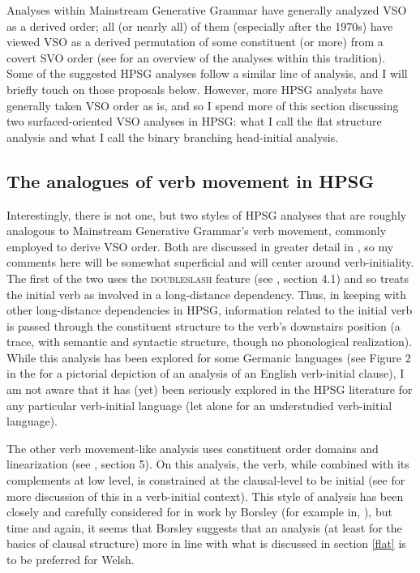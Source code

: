 \documentclass[output=paper]{langsci/langscibook}
\begin{document}
{Analyses within Mainstream Generative Grammar have generally analyzed VSO as a derived order; all (or nearly all) of them (especially after the 1970s) have viewed VSO as a derived permutation of some constituent (or more) from a covert SVO order (see \citealt{clemenspolinsky17} for an overview of the analyses within this tradition). Some of the suggested HPSG analyses follow a similar line of analysis, and I will briefly touch on those proposals below. However, more HPSG analysts have generally taken VSO order as is, and so I spend more of this section discussing two surfaced-oriented VSO analyses in HPSG: what I call the flat structure analysis and what I call the binary branching head-initial analysis.  

\subsection{The analogues of verb movement in HPSG}

Interestingly, there is not one, but two styles of HPSG analyses that are roughly analogous to Mainstream Generative Grammar's verb movement, commonly employed to derive VSO order. Both are discussed in greater detail in , so my comments here will be somewhat superficial and will center around verb-initiality. The first of the two uses the \textsc{doubleslash} feature (see , section 4.1) and so treats the initial verb as involved in a long-distance dependency. Thus, in keeping with other long-distance dependencies in HPSG, information related to the initial verb is passed through the constituent structure to the verb's downstairs position (a trace, with semantic and syntactic structure, though no phonological realization). While this analysis has been explored for some Germanic languages (see Figure 2 in the  for a pictorial depiction of an analysis of an English verb-initial clause), I am not aware that it has (yet) been seriously explored in the HPSG literature for any particular verb-initial language (let alone for an understudied verb-initial language).  

The other verb movement-like analysis uses constituent order domains and linearization (see , section 5). On this analysis, the verb, while combined with its complements at low level, is constrained at the clausal-level to be initial (see \citealt{borsley06} for more discussion of this in a verb-initial context). This style of analysis has been closely and carefully considered for  in work by Borsley (for example in, \citealt{Borsley89b,borsley95,Borsley2009a-u}), but time and again, it seems that Borsley suggests that an analysis (at least for the basics of clausal structure) more in line with what is discussed in section \ref{flat} is to be preferred for Welsh.   

}
\end{document}

